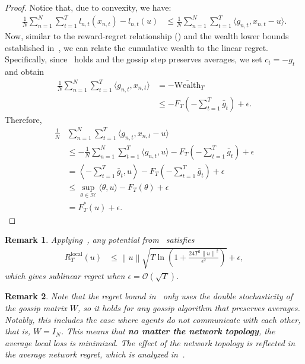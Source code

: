\documentclass[journal]{IEEEtran} %
\newtheorem{remark}{Remark}
\newcommand{\w}{\text{Wealth}}
\newcommand{\br}[1]{\left(#1\right)}
\newcommand{\bigo}[1]{\mathcal{O}\br{#1}}
\newcommand{\norm}[1]{\left\lVert{#1}\right\rVert}
\newcommand{\Hil}{\mathcal{H}} %
\begin{document}
\begin{proof}
    Notice that, due to convexity, we have:
    \begin{align*}
        \frac{1}{N} \sum_{n=1}^N \sum_{t=1}^T l_{n,t}(x_{n,t}) - l_{n,t}(u) & \leq \frac{1}{N} \sum_{n=1}^N \sum_{t=1}^T \langle g_{n,t}, x_{n,t} - u \rangle.
    \end{align*}
    Now, similar to the reward-regret relationship () and the wealth lower bounds established in~, we can relate the cumulative wealth to the linear regret.
    Specifically, since~ holds and the gossip step preserves averages, we set $c_t = -g_t$ and obtain
    \begin{align}
        \frac{1}{N} \sum_{n=1}^N \sum_{t=1}^T \langle g_{n,t}, x_{n,t} \rangle & = - \overline{\w}_T                                  \\
                                                                               & \leq - F_T\br{- \sum_{t=1}^T \bar g_{t}} + \epsilon.
    \end{align}
    Therefore,
    \begin{align}
        \frac{1}{N} & \sum_{n=1}^N \sum_{t=1}^T \langle g_{n,t}, x_{n,t} - u \rangle                                                         \\
                    & \leq - \frac{1}{N} \sum_{n=1}^N \sum_{t=1}^T \langle g_{n,t}, u \rangle - F_T\br{- \sum_{t=1}^T \bar g_{t}} + \epsilon \\
                    & = \left\langle -\sum_{t=1}^T \bar g_{t}, u \right\rangle - F_T\br{- \sum_{t=1}^T \bar g_{t}} + \epsilon                \\
                    & \leq \sup_{\theta \in \Hil{}} \langle \theta, u \rangle - F_T(\theta) + \epsilon                                       \\
                    & = F_T^*(u) + \epsilon.
    \end{align}
\end{proof}
\begin{remark}
    Applying~\cite[Corollary 5]{orabona_coin_2016}, any potential from~ satisfies
    \begin{align*}
        R_T^{\text{local}}(u) & \leq \norm{u} \sqrt{T \ln \br{1 + \frac{24T^2 \norm{u}^2}{\epsilon^2}}} + \epsilon,
    \end{align*}
    which gives sublinear regret when $\epsilon = \bigo{\sqrt{T}}$.
\end{remark}
\begin{remark}
    Note that the regret bound in~ only uses the double stochasticity of the gossip matrix $W$, so it holds for any gossip algorithm that preserves averages.
    Notably, this includes the case where agents do not communicate with each other, that is, $W = I_N$.
    This means that \textbf{no matter the network topology}, the average local loss is minimized.
    The effect of the network topology is reflected in the average network regret, which is analyzed in~.
\end{remark}
\end{document}
